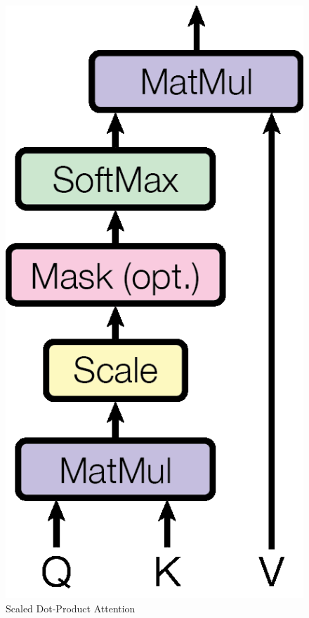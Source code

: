 \begin{minipage}[ht]{.35\textwidth}
    \centering
    \begin{figure}[H]
        \centering
        \includegraphics[width=.48\textwidth]{literature/imgs/ext-attention-dot-product.png}
        \caption{Scaled Dot-Product Attention \cite{vaswani2017attention}}
        \label{fig:ext-attention-dot-product}
    \end{figure}
    \vspace*{-.5cm}
    \begin{figure}[H]
        \centering

\end{figure}
\end{minipage}
